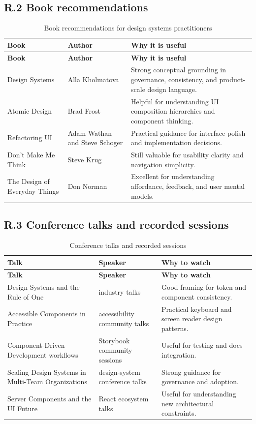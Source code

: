 \subsection*{R.2 Book recommendations}
\begin{longtable}{@{}p{}p{}p{}@{}}
\caption{Book recommendations for design systems practitioners}\label{tab:bibliography-books}\\
\toprule
\textbf{Book} & \textbf{Author} & \textbf{Why it is useful} \\
\midrule
\endfirsthead
\toprule
\textbf{Book} & \textbf{Author} & \textbf{Why it is useful} \\
\midrule
\endhead
\bottomrule
\endfoot
Design Systems & Alla Kholmatova & Strong conceptual grounding in governance, consistency, and product-scale design language. \\
Atomic Design & Brad Frost & Helpful for understanding UI composition hierarchies and component thinking. \\
Refactoring UI & Adam Wathan and Steve Schoger & Practical guidance for interface polish and implementation decisions. \\
Don't Make Me Think & Steve Krug & Still valuable for usability clarity and navigation simplicity. \\
The Design of Everyday Things & Don Norman & Excellent for understanding affordance, feedback, and user mental models. \\
\end{longtable}

\subsection*{R.3 Conference talks and recorded sessions}
\begin{longtable}{@{}p{}p{}p{}@{}}
\caption{Conference talks and recorded sessions}\label{tab:bibliography-talks}\\
\toprule
\textbf{Talk} & \textbf{Speaker} & \textbf{Why to watch} \\
\midrule
\endfirsthead
\toprule
\textbf{Talk} & \textbf{Speaker} & \textbf{Why to watch} \\
\midrule
\endhead
\bottomrule
\endfoot
Design Systems and the Rule of One & industry talks & Good framing for token and component consistency. \\
Accessible Components in Practice & accessibility community talks & Practical keyboard and screen reader design patterns. \\
Component-Driven Development workflows & Storybook community sessions & Useful for testing and docs integration. \\
Scaling Design Systems in Multi-Team Organizations & design-system conference talks & Strong guidance for governance and adoption. \\
Server Components and the UI Future & React ecosystem talks & Useful for understanding new architectural constraints. \\
\end{longtable}

